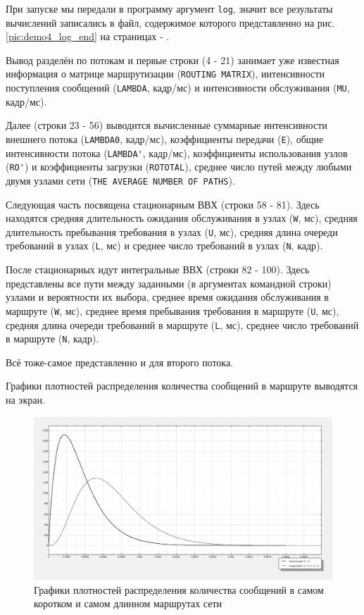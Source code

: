 \documentclass[oneside, final, 14pt, a4paper]{extreport}
\begin{document}
При запуске мы передали в программу аргумент \verb:log:, значит все результаты вычислений записались в файл, содержимое которого представленно на рис. \ref{pic:demo4_log_end} на страницах \pageref{pic:demo4_log_begin} - \pageref{pic:demo4_log_end}.

Вывод разделён по потокам и первые строки (4 - 21) занимает уже известная информация о матрице маршрутизации (\verb:ROUTING MATRIX:), интенсивности поступления сообщений (\verb:LAMBDA:, кадр/мс) и интенсивности обслуживания (\verb:MU:, кадр/мс).

Далее (строки 23 - 56) выводится вычисленные суммарные интенсивности внешнего потока (\verb:LAMBDA0:, кадр/мс), коэффициенты передачи (\verb:E:), общие интенсивности потока (\verb:LAMBDA':, кадр/мс), коэффициенты использования узлов (\verb:RO':) и коэффициенты загрузки (\verb:ROTOTAL:), среднее число путей между любыми двумя узлами сети  (\verb:THE AVERAGE NUMBER OF PATHS:).

Следующая часть посвящена стационарным ВВХ (строки 58 - 81). Здесь находятся средняя длительность ожидания обслуживания в узлах (\verb:W:, мс), средняя длительность пребывания требования в узлах (\verb:U:, мс), средняя длина очереди требований в узлах (\verb:L:, мс) и среднее число требований в узлах (\verb:N:, кадр).

После стационарных идут интегральные ВВХ (строки 82 - 100). Здесь представлены все пути между заданными (в аргументах командной строки) узлами и вероятности их выбора, среднее время ожидания обслуживания в маршруте (\verb:W:, мс), среднее время пребывания требования в маршруте (\verb:U:, мс), средняя длина очереди требований в маршруте (\verb:L:, мс), среднее число требований в маршруте (\verb:N:, кадр).

Всё тоже-самое представленно и для второго потока.

Графики плотностей распределения количества сообщений в маршруте выводятся на экран.

\begin{figure}[h!]
	\centering
	\includegraphics[width=\textwidth]{demo4_chart}
	
	\caption{Графики плотностей распределения количества сообщений в самом коротком и самом длинном маршрутах сети}
	\label{pic:demo4_graph}
\end{figure}
\end{document}
